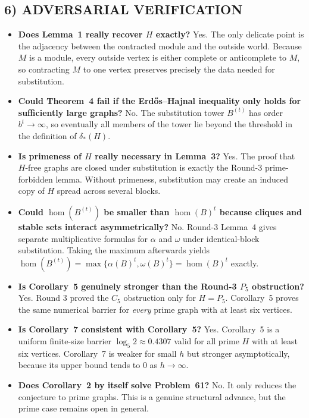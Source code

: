 \subsection*{6) ADVERSARIAL VERIFICATION}
\begin{itemize}
\item \textbf{Does Lemma~1 really recover $H$ exactly?}
Yes. The only delicate point is the adjacency between the contracted module and the outside world. Because $M$ is a module, every outside vertex is either complete or anticomplete to $M$, so contracting $M$ to one vertex preserves precisely the data needed for substitution.

\item \textbf{Could Theorem~4 fail if the Erd\H{o}s--Hajnal inequality only holds for sufficiently large graphs?}
No. The substitution tower $B^{(t)}$ has order $b^t\to\infty$, so eventually all members of the tower lie beyond the threshold in the definition of $\delta_*(H)$.

\item \textbf{Is primeness of $H$ really necessary in Lemma~3?}
Yes. The proof that $H$-free graphs are closed under substitution is exactly the Round-3 prime-forbidden lemma. Without primeness, substitution may create an induced copy of $H$ spread across several blocks.

\item \textbf{Could $\hom(B^{(t)})$ be smaller than $\hom(B)^t$ because cliques and stable sets interact asymmetrically?}
No. Round-3 Lemma~4 gives separate multiplicative formulas for $\alpha$ and $\omega$ under identical-block substitution. Taking the maximum afterwards yields
\(
\hom(B^{(t)})=\max\{\alpha(B)^t,\omega(B)^t\}=\hom(B)^t
\)
exactly.

\item \textbf{Is Corollary~5 genuinely stronger than the Round-3 $P_5$ obstruction?}
Yes. Round 3 proved the $C_5$ obstruction only for $H=P_5$.
Corollary~5 proves the same numerical barrier for \emph{every} prime graph with at least six vertices.

\item \textbf{Is Corollary~7 consistent with Corollary~5?}
Yes. Corollary~5 is a uniform finite-size barrier $\log_5 2\approx 0.4307$ valid for all prime $H$ with at least six vertices.
Corollary~7 is weaker for small $h$ but stronger asymptotically, because its upper bound tends to $0$ as $h\to\infty$.

\item \textbf{Does Corollary~2 by itself solve Problem~61?}
No. It only reduces the conjecture to prime graphs.
This is a genuine structural advance, but the prime case remains open in general.
\end{itemize}

